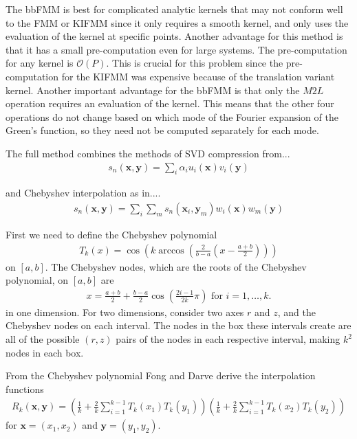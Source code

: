 \documentclass[11pt, oneside]{article}   	%
\begin{document}
The bbFMM is best for complicated analytic kernels that may not conform well to the FMM or KIFMM since it only requires a smooth kernel, and only uses the evaluation of the kernel at specific points. Another advantage for this method is that it has a small pre-computation even for large systems. The pre-computation for any kernel is $\mathcal{O}(P)$. This is crucial for this problem since the pre-computation for the KIFMM was expensive because of the translation variant kernel. Another important advantage for the bbFMM is that only the $M2L$ operation requires an evaluation of the kernel. This means that the other four operations do not change based on which mode of the Fourier expansion of the Green's function, so they need not be computed separately for each mode.

The full method combines the methods of SVD compression from...
\begin{align}
s_n(\mathbf{x},\mathbf{y})=\sum_i \alpha_i u_i(\mathbf{x})v_i(\mathbf{y})
\end{align}

and Chebyshev interpolation as in....
\begin{align}
s_n(\mathbf{x},\mathbf{y})=\sum_i\sum_m s_n(\mathbf{x}_i,\mathbf{y}_m)w_i(\mathbf{x})w_m(\mathbf{y})
\end{align}

First we need to define the Chebyshev polynomial
\begin{align}
T_k(x)=\cos(k\arccos(\frac{2}{b-a}(x-\frac{a+b}{2})))
\end{align}
on $[a,b]$. The Chebyshev nodes, which are the roots of the Chebyshev polynomial, on $[a,b]$ are
\begin{align}
x=\frac{a+b}{2}+\frac{b-a}{2}\cos(\frac{2i-1}{2k}\pi)\mbox{ for }i=1,\dots,k.
\end{align}
in one dimension. For two dimensions, consider two axes $r$ and $z$, and the Chebyshev nodes on each interval. The nodes in the box these intervals create are all of the possible $(r,z)$ pairs of the nodes in each respective interval, making $k^2$ nodes in each box.

From the Chebyshev polynomial Fong and Darve derive the interpolation functions
\begin{align}
R_k(\mathbf{x},\mathbf{y}) = (\frac{1}{k} + \frac{2}{k}\sum_{i=1}^{k-1}T_k(x_1)T_k(y_1))(\frac{1}{k} + \frac{2}{k}\sum_{i=1}^{k-1}T_k(x_2)T_k(y_2))
\end{align}
for $\mathbf{x}=(x_1,x_2)$ and $\mathbf{y}=(y_1,y_2)$.
\end{document}
